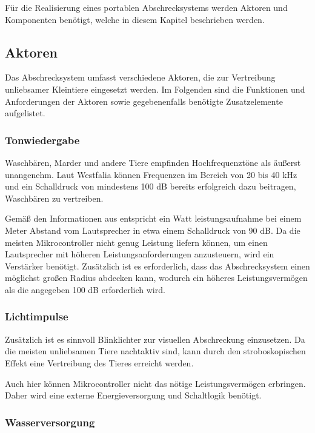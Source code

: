 Für die Realisierung eines portablen Abschrecksystems werden Aktoren und Komponenten benötigt, welche in diesem Kapitel beschrieben werden.

\subsection{Aktoren}

Das Abschrecksystem umfasst verschiedene Aktoren, die zur Vertreibung unliebsamer Kleintiere eingesetzt werden. Im Folgenden sind die Funktionen und Anforderungen der Aktoren sowie gegebenenfalls benötigte Zusatzelemente aufgelistet.

\subsubsection{Tonwiedergabe}

Waschbären, Marder und andere Tiere empfinden Hochfrequenztöne als äußerst unangenehm. Laut Westfalia \cite{westfalia_wasch} können Frequenzen im Bereich von 20 bis 40 kHz und ein Schalldruck von mindestens 100 dB bereits erfolgreich dazu beitragen, Waschbären zu vertreiben.

Gemäß den Informationen aus \cite{sound_amplifier} entspricht ein Watt leistungsaufnahme bei einem Meter Abstand vom Lautsprecher in etwa einem Schalldruck von 90 dB. Da die meisten Mikrocontroller nicht genug Leistung liefern können, um einen Lautsprecher mit höheren Leistungsanforderungen anzusteuern, wird ein Verstärker benötigt. Zusätzlich ist es erforderlich, dass das Abschrecksystem einen möglichst großen Radius abdecken kann, wodurch ein höheres Leistungsvermögen als die angegeben 100 dB erforderlich wird.

\subsubsection{Lichtimpulse}

Zusätzlich ist es sinnvoll Blinklichter zur visuellen Abschreckung einzusetzen. Da die meisten unliebsamen Tiere nachtaktiv sind, kann durch den stroboskopischen Effekt eine Vertreibung des Tieres erreicht werden. \cite{anti_wasch}

Auch hier können Mikrocontroller nicht das nötige Leistungsvermögen erbringen. Daher wird eine externe Energieversorgung und Schaltlogik benötigt.

\subsubsection{Wasserversorgung}

